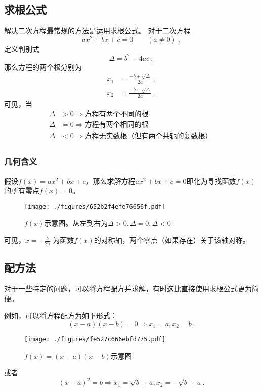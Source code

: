 
\subsection{求根公式}
解决二次方程最常规的方法是运用求根公式。
对于二次方程
$$ax^2+bx+c=0 \qquad (a\neq 0)~,$$
定义判别式
$$\Delta = b^2-4ac~,$$
那么方程的两个根分别为
$$
\begin{aligned}
x_1&=\frac{-b+\sqrt{\Delta}}{2a}~,\\
x_2&=\frac{-b-\sqrt{\Delta}}{2a}~.
\end{aligned}
$$
可见，当
$$
\begin{aligned}
\Delta &> 0 \Rightarrow \text{方程有两个不同的根}\\
\Delta &= 0 \Rightarrow \text{方程有两个相同的根}\\
\Delta &< 0 \Rightarrow \text{方程无实数根（但有两个共轭的复数根）}\\
\end{aligned}~
$$

\subsubsection{几何含义}
假设$f(x)=ax^2+bx+c$，那么求解方程$ax^2+bx+c=0$即化为寻找函数$f(x)$的所有零点$f(x)=0$。
\begin{figure}[ht]
\centering
\texttt{[image: ./figures/652b2f4efe76656f.pdf]}
\caption{$f(x)$示意图。从左到右为$\Delta > 0, \Delta = 0, \Delta < 0$} \label{fig_quasol_1}
\end{figure}
可见，$x=-\frac{b}{2a}$ 为函数$f(x)$的对称轴，两个零点（如果存在）关于该轴对称。

\subsection{配方法}
对于一些特定的问题，可以将方程配方并求解，有时这比直接使用求根公式更为简便。

例如，可以将方程配方为如下形式：
$$(x-a)(x-b)=0\Rightarrow x_1=a, x_2=b~.$$
\begin{figure}[ht]
\centering
\texttt{[image: ./figures/fe527c666ebfd775.pdf]}
\caption{$f(x)=(x-a)(x-b)$示意图} \label{fig_quasol_2}
\end{figure}
或者
$$(x-a)^2=b\Rightarrow x_1=\sqrt{b}+a, x_2=-\sqrt{b}+a~.$$
